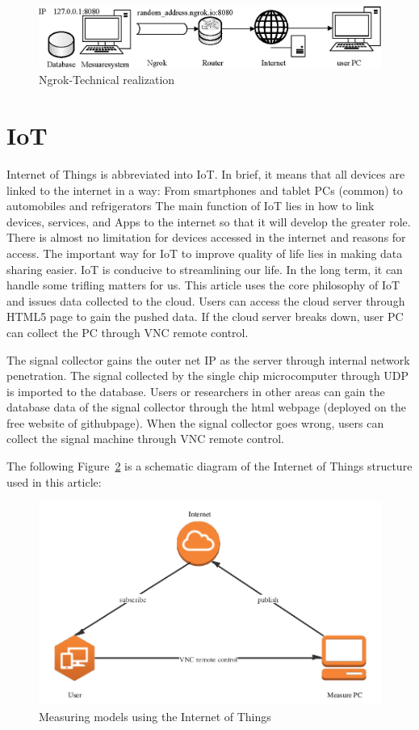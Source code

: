\begin{figure}[!ht]
	\centering
	\includegraphics[width=15cm]{grafiken/2.15.eps}
	\caption{Ngrok-Technical realization} 
	\label{fig:2.15}
\end{figure}
\FloatBarrier

\section{IoT}
\label{sec:IoT}
Internet of Things is abbreviated into IoT. 
In brief, it means that all devices are linked to the internet in a way: 
From smartphones and tablet PCs (common) to automobiles and refrigerators 
The main function of IoT lies in how to link devices, services, and Apps to the internet so that it will develop the greater role. There is almost no limitation for devices accessed in the internet and reasons for access. 
The important way for IoT to improve quality of life lies in making data sharing easier. IoT is conducive to streamlining our life. In the long term, it can handle some trifling matters for us. 
This article uses the core philosophy of IoT and issues data collected to the cloud. Users can access the cloud server through HTML5 page to gain the pushed data. If the cloud server breaks down, user PC can collect the PC through VNC remote control. 

The signal collector gains the outer net IP as the server through internal network penetration. The signal collected by the single chip microcomputer through UDP is imported to the database. Users or researchers in other areas can gain the database data of the signal collector through the html webpage (deployed on the free website of githubpage). When the signal collector goes wrong, users can collect the signal machine through VNC remote control. 

The following Figure~\ref{fig:2.16} is a schematic diagram of the Internet of Things structure used in this article:
\begin{figure}[!ht]
	\centering
	\includegraphics[width=15cm]{grafiken/2.16.pdf}
	\caption{Measuring models using the Internet of Things} 
	\label{fig:2.16}
\end{figure}
\FloatBarrier

